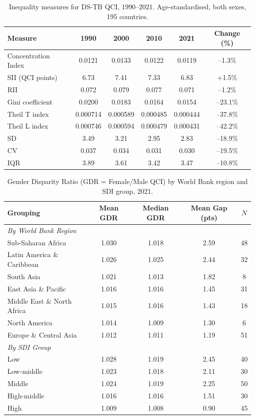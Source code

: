 \documentclass[12pt]{article}
\begin{document}
\clearpage

\begin{table}[htbp]
\centering
\caption{Inequality measures for DS-TB QCI, 1990--2021. Age-standardised, both sexes, 195 countries.}
\label{tab:table1}
\small
\begin{tabular}{lccccc}
\toprule
Measure & 1990 & 2000 & 2010 & 2021 & Change (\%) \\
\midrule
Concentration Index & 0.0121 & 0.0133 & 0.0122 & 0.0119 & --1.3\% \\
SII (QCI points) & 6.73 & 7.41 & 7.33 & 6.83 & +1.5\% \\
RII & 0.072 & 0.079 & 0.077 & 0.071 & --1.2\% \\
Gini coefficient & 0.0200 & 0.0183 & 0.0164 & 0.0154 & --23.1\% \\
Theil T index & 0.000714 & 0.000589 & 0.000485 & 0.000444 & --37.8\% \\
Theil L index & 0.000746 & 0.000594 & 0.000479 & 0.000431 & --42.2\% \\
SD & 3.49 & 3.21 & 2.95 & 2.83 & --18.9\% \\
CV & 0.037 & 0.034 & 0.031 & 0.030 & --19.5\% \\
IQR & 3.89 & 3.61 & 3.42 & 3.47 & --10.8\% \\
\bottomrule
\end{tabular}
\end{table}

\clearpage

\begin{table}[htbp]
\centering
\caption{Gender Disparity Ratio (GDR = Female/Male QCI) by World Bank region and SDI group, 2021.}
\label{tab:table2}
\small
\begin{tabular}{lcccc}
\toprule
Grouping & Mean GDR & Median GDR & Mean Gap (pts) & $N$ \\
\midrule
\multicolumn{5}{l}{\textit{By World Bank Region}} \\
\midrule
Sub-Saharan Africa & 1.030 & 1.018 & 2.59 & 48 \\
Latin America \& Caribbean & 1.026 & 1.025 & 2.44 & 32 \\
South Asia & 1.021 & 1.013 & 1.82 & 8 \\
East Asia \& Pacific & 1.016 & 1.016 & 1.45 & 31 \\
Middle East \& North Africa & 1.015 & 1.016 & 1.43 & 18 \\
North America & 1.014 & 1.009 & 1.30 & 6 \\
Europe \& Central Asia & 1.012 & 1.011 & 1.19 & 51 \\
\midrule
\multicolumn{5}{l}{\textit{By SDI Group}} \\
\midrule
Low & 1.028 & 1.019 & 2.45 & 40 \\
Low-middle & 1.023 & 1.018 & 2.11 & 30 \\
Middle & 1.024 & 1.019 & 2.25 & 50 \\
High-middle & 1.016 & 1.016 & 1.51 & 30 \\
High & 1.009 & 1.008 & 0.90 & 45 \\
\bottomrule
\end{tabular}
\end{table}
\end{document}
